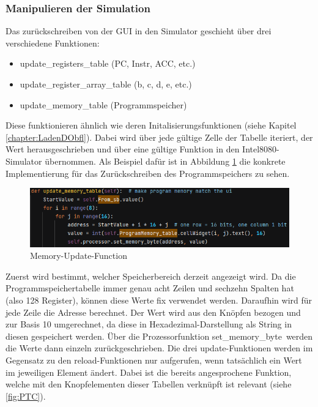 \documentclass[12pt]{article}
\newcommand{\imgSpaceBefore}{\vspace{10pt}}
\begin{document}
\subsubsection{Manipulieren der Simulation}
Das zurückschreiben von der GUI in den Simulator geschieht über drei verschiedene Funktionen:\imgSpaceBefore

\begin{itemize}
	\item update\_registers\_table (PC, Instr, ACC, etc.)
	\item update\_register\_array\_table (b, c, d, e, etc.)
	\item update\_memory\_table (Programmspeicher)
\end{itemize}

\noindent
Diese funktionieren ähnlich wie deren Initalisierungsfunktionen (siehe Kapitel \ref{chapter:LadenDObfl}). Dabei wird über jede gültige Zelle der Tabelle iteriert, der Wert herausgeschrieben und über eine gültige Funktion in den Intel8080-Simulator übernommen. Als Beispiel dafür ist in Abbildung \ref{fig:MemUpdateFunc} die konkrete Implementierung für das Zurückschreiben des Programmspeichers zu sehen.\imgSpaceBefore

\begin{figure}[H]
\centering
\includegraphics[width=15cm]{bilder/UpdateProgMem}
\caption{Memory-Update-Function}
\label{fig:MemUpdateFunc}
\end{figure}

\noindent
Zuerst wird bestimmt, welcher Speicherbereich derzeit angezeigt wird. Da die Programmspeichertabelle immer genau acht Zeilen und sechzehn Spalten hat (also 128 Register), können diese Werte fix verwendet werden. Daraufhin wird für jede Zeile die Adresse berechnet. Der Wert wird aus den Knöpfen bezogen und zur Basis 10 umgerechnet, da diese in Hexadezimal-Darstellung als String in diesen gespeichert werden. Über die Prozessorfunktion \glqq set\_memory\_byte\grqq\ werden die Werte dann einzeln zurückgeschrieben. Die drei \glqq update\grqq-Funktionen werden im Gegensatz zu den \glqq reload\grqq-Funktionen nur aufgerufen, wenn tatsächlich ein Wert im jeweiligen Element ändert. Dabei ist die bereits angesprochene Funktion, welche mit den Knopfelementen dieser Tabellen verknüpft ist relevant (siehe \ref{fig:PTC}).\imgSpaceBefore
\end{document}
